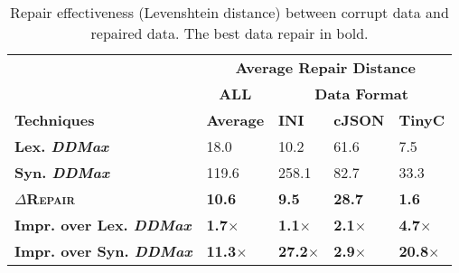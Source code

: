 \documentclass[acmsmall,screen,review,anonymous]{acmart}
\newcommand{\approach}{\textsc{$\Delta$Repair}\xspace}
\newcommand{\ddmax}{\textit{DDMax}\xspace}
\begin{document}

\begin{table}[!tbp]
\caption{Repair effectiveness (Levenshtein distance) between corrupt data and repaired data. 
The best data repair in bold.}
\begin{tabular}{|p{4.0cm}|p{1.5cm}|p{1.5cm}|p{1.5cm}|p{1.5cm}|}
\hline
 &  \multicolumn{4}{c|}{\textbf{Average Repair Distance}}  \\
&  \multicolumn{1}{c|}{\textbf{ALL}} &   \multicolumn{3}{c|}{\textbf{Data Format}}  \\
\textbf{Techniques} & \textbf{Average}  & \textbf{INI} & \textbf{cJSON} & \textbf{TinyC} \\
\hline
\textbf{Lex. \ddmax} & 18.0 & {10.2} &  61.6 &  7.5 \\
\textbf{Syn. \ddmax} & 119.6 &  258.1 & 82.7 &  33.3 \\
\hline
\textbf{\approach} & \textbf{10.6}  & \textbf{9.5} &  \textbf{28.7} & \textbf{1.6} \\
\hline
\textbf{Impr. over Lex. \ddmax} & \textbf{1.7$\times$} & \textbf{1.1$\times$} & \textbf{2.1$\times$} & \textbf{4.7$\times$} \\
\textbf{Impr. over Syn. \ddmax} & \textbf{11.3$\times$} & \textbf{27.2$\times$} & \textbf{2.9$\times$} & \textbf{20.8$\times$} \\
\hline
\end{tabular}
\label{tab:datarepairquality}
\end{table}
\end{document}
